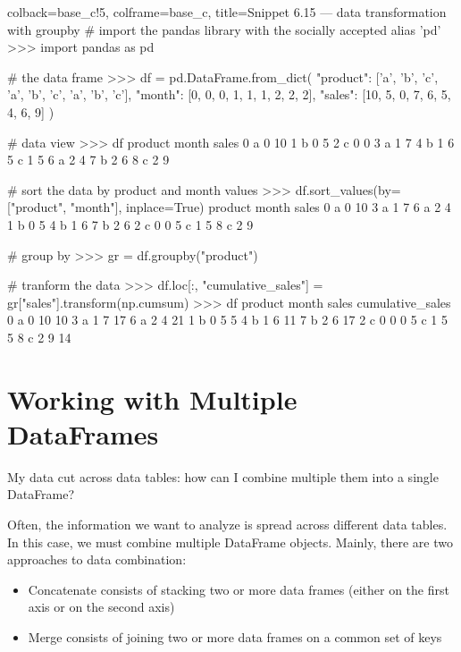 \documentclass[a4paper,11pt]{book}
\newcommand{\question}[1]{%
    \begin{tcolorbox}[colback=comp_c!10,colframe=comp_c,sidebyside align=top,width=\linewidth,before skip=1ex]
        #1
    \end{tcolorbox}
    \switchcolumn%
}
\newcommand{\note}[1]{%
    \begin{tcolorbox}[colback=white!0,colframe=white!10,width=\linewidth,before skip=1ex]
        #1
    \end{tcolorbox}
}
\begin{document}
\begin{pythoncode}[linenos=True]{colback=base_c!5, colframe=base_c, title=\sffamily Snippet 6.15 --- data transformation with groupby}
# import the pandas library with the socially accepted alias 'pd'
>>> import pandas as pd

# the data frame
>>> df = pd.DataFrame.from_dict(
	{
	    "product": ['a', 'b', 'c', 'a', 'b', 'c', 'a', 'b', 'c'],	
	    "month": [0, 0, 0, 1, 1, 1, 2, 2, 2],
	    "sales": [10,  5,  0,  7,  6,  5,  4,  6,  9]
	}
    )

# data view
>>> df
  product  month  sales
0       a      0     10
1       b      0      5
2       c      0      0
3       a      1      7
4       b      1      6
5       c      1      5
6       a      2      4
7       b      2      6
8       c      2      9


# sort the data by product and month values
>>> df.sort_values(by=["product", "month"], inplace=True)
  product  month  sales
0       a      0     10
3       a      1      7
6       a      2      4
1       b      0      5
4       b      1      6
7       b      2      6
2       c      0      0
5       c      1      5
8       c      2      9

# group by
>>> gr = df.groupby("product")

# tranform the data
>>> df.loc[:, "cumulative_sales"] = gr["sales"].transform(np.cumsum)
>>> df
  product  month  sales  cumulative_sales
0       a      0     10                10
3       a      1      7                17
6       a      2      4                21
1       b      0      5                 5
4       b      1      6                11
7       b      2      6                17
2       c      0      0                 0
5       c      1      5                 5
8       c      2      9                14
\end{pythoncode}

\section{Working with Multiple DataFrames}

\begin{paracol}{2}
	\question{\raggedright My data cut across data tables: how can I combine multiple them into a single DataFrame?}
	\note{Often, the information we want to analyze is spread across different data tables. In this case, we must combine multiple DataFrame objects. Mainly, there are two approaches to data combination:
		\begin{itemize}
			\item Concatenate consists of stacking two or more data frames (either on the first axis or on the second axis)
			\item Merge consists of joining two or more data frames on a common set of keys 
		\end{itemize}
	}
\end{paracol}
\clearpage
\end{document}
